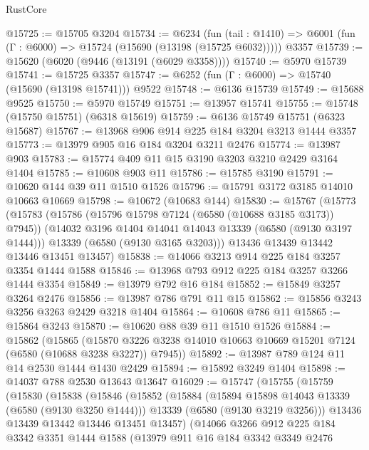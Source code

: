 \begin{lexlean}{RustCore}
\begin{coremodule}
@15725 := @15705 @3204
@15734 := @6234
    (fun (tail : @1410) => @6001 (fun (Γ : @6000) => @15724 (@15690 (@13198 (@15725 @6032)))))
    @3357
@15739 := @15620 (@6020 (@9446 (@13191 (@6029 @3358))))
@15740 := @5970 @15739
@15741 := @15725 @3357
@15747 := @6252 (fun (Γ : @6000) => @15740 (@15690 (@13198 @15741))) @9522
@15748 := @6136 @15739
@15749 := @15688 @9525
@15750 := @5970 @15749
@15751 := @13957 @15741
@15755 := @15748 (@15750 @15751) (@6318 @15619)
@15759 := @6136 @15749 @15751 (@6323 @15687)
@15767 := @13968 @906 @914 @225 @184 @3204 @3213 @1444 @3357
@15773 := @13979 @905 @16 @184 @3204 @3211 @2476
@15774 := @13987 @903
@15783 := @15774 @409 @11 @15 @3190 @3203 @3210 @2429 @3164 @1404
@15785 := @10608 @903 @11
@15786 := @15785 @3190
@15791 := @10620 @144 @39 @11 @1510 @1526
@15796 := @15791 @3172 @3185 @14010 @10663 @10669
@15798 := @10672 (@10683 @144)
@15830 := @15767
    (@15773
      (@15783
        (@15786 (@15796 @15798 @7124 (@6580 (@10688 @3185 @3173)) @7945))
        (@14032 @3196 @1404 @14041 @14043 @13339 (@6580 (@9130 @3197 @1444)))
        @13339
        (@6580 (@9130 @3165 @3203)))
      @13436
      @13439
      @13442
      @13446
      @13451
      @13457)
@15838 := @14066 @3213 @914 @225 @184 @3257 @3354 @1444 @1588
@15846 := @13968 @793 @912 @225 @184 @3257 @3266 @1444 @3354
@15849 := @13979 @792 @16 @184
@15852 := @15849 @3257 @3264 @2476
@15856 := @13987 @786 @791 @11 @15
@15862 := @15856 @3243 @3256 @3263 @2429 @3218 @1404
@15864 := @10608 @786 @11
@15865 := @15864 @3243
@15870 := @10620 @88 @39 @11 @1510 @1526
@15884 := @15862
    (@15865
      (@15870 @3226 @3238 @14010 @10663 @10669 @15201 @7124 (@6580 (@10688 @3238 @3227)) @7945))
@15892 := @13987 @789 @124 @11 @14 @2530 @1444 @1430 @2429
@15894 := @15892 @3249 @1404
@15898 := @14037 @788 @2530 @13643 @13647
@16029 := @15747
    (@15755
      (@15759
        (@15830
          (@15838
            (@15846
              (@15852
                (@15884
                  (@15894 @15898 @14043 @13339 (@6580 (@9130 @3250 @1444)))
                  @13339
                  (@6580 (@9130 @3219 @3256)))
                @13436
                @13439
                @13442
                @13446
                @13451
                @13457)
              (@14066
                @3266
                @912
                @225
                @184
                @3342
                @3351
                @1444
                @1588
                (@13979
                  @911
                  @16
                  @184
                  @3342
                  @3349
                  @2476

\end{coremodule}
\end{lexlean}
